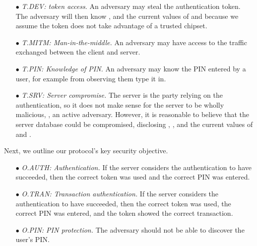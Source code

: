 \begin{itemize}[leftmargin=3.2mm]
\item[$\bullet$]\textit{T.DEV: token access.} An adversary may steal the authentication token. The adversary will then know , \VC{\salt} and the current values of \VC{\counter} and \VC{\state} because we assume the token does not take advantage of a trusted chipset. 


\item[$\bullet$]\textit{T.MITM: Man-in-the-middle.} An adversary may have access to the traffic exchanged between the client and server.

\item[$\bullet$]\textit{T.PIN: Knowledge of PIN.} An adversary may know the PIN entered by a user, for example from observing them type it in.

\item[$\bullet$]\textit{T.SRV: Server compromise.} The server is the party relying on the authentication, so it does not make sense for the server to be wholly malicious, \ie, an active adversary.
However, it is reasonable to believe that the server database could be compromised, disclosing , \VS{\verifier}, and the current values of \VC{\counter} and \VC{\state}.


\end{itemize}



Next, we outline our protocol's key security objective.

\begin{itemize}[leftmargin=3.2mm]
\item[$\bullet$]\textit{O.AUTH: Authentication.} If the server considers the authentication to have succeeded,  then the correct token was used and the correct PIN was entered.

\item[$\bullet$]\textit{O.TRAN: Transaction authentication.} If the server considers the authentication to have succeeded, then the correct token was used, the correct PIN was entered, and the token showed the correct transaction.

\item[$\bullet$]\textit{O.PIN: PIN protection.} The adversary should not be able to discover the user's PIN. 
\end{itemize}


